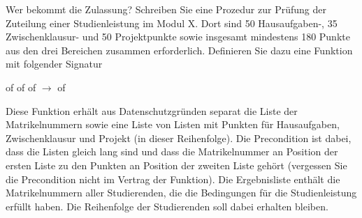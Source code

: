 \documentclass{../tuda-exercise}
\begin{document}
  \clearpagesolution

  \begin{task}[credit=\stars{3}{3}]{Wer bekommt die Zulassung?}
    Schreiben Sie eine Prozedur zur Prüfung der Zuteilung einer Studienleistung im Modul X. Dort
    sind 50 Hausaufgaben-, 35 Zwischenklausur- und 50 Projektpunkte sowie insgesamt mindestens
    180 Punkte aus den drei Bereichen zusammen erforderlich. Definieren Sie dazu eine Funktion
     mit folgender Signatur

    \br

     of   of  of
     \(\rightarrow\)  of 

    \br

    Diese Funktion erhält aus Datenschutzgründen separat die Liste der Matrikelnummern sowie eine
    Liste von Listen mit Punkten für Hausaufgaben, Zwischenklausur und Projekt (in dieser
    Reihenfolge). Die Precondition ist dabei, dass die Listen gleich lang sind und dass die
    Matrikelnummer an Position  der ersten Liste zu den Punkten an Position
     der zweiten Liste gehört (vergessen Sie die Precondition nicht im Vertrag
    der Funktion). Die Ergebnisliste enthält die Matrikelnummern aller Studierenden, die die
    Bedingungen für die Studienleistung erfüllt haben. Die Reihenfolge der Studierenden soll
    dabei erhalten bleiben.

    \begin{solution}
      
    \end{solution}
  \end{task}

  \clearpage
\end{document}
